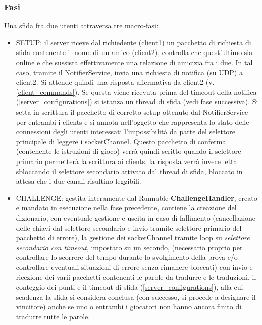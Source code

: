 \documentclass{article}
\begin{document}
    \subsubsection{Fasi}\label{server_challenge_phases} Una sfida fra due utenti attraversa tre macro-fasi:
    \begin{itemize}
        \item SETUP: il server riceve dal richiedente (client1) un pacchetto di richiesta di sfida contenente il nome di un amico (client2), controlla che quest'ultimo sia online e che sussista effettivamente una relazione di amicizia fra i due. In tal caso, tramite il NotifierService, invia una richiesta di notifica (su UDP) a client2. Si attende quindi una risposta affermativa da client2 (v. \ref{client_commands}). Se questa viene ricevuta prima del timeout della notifica (\ref{server_configurations}) si istanza un thread di sfida (vedi fase successiva). Si setta in scrittura il pacchetto di corretto setup ottenuto dal NotifierService per entrambi i clients e si annota nell'oggetto che rappresenta lo stato delle connessioni degli utenti interessati l'impossibilità da parte del selettore principale di leggere i socketChannel. Questo pacchetto di conferma (contenente le istruzioni di gioco) verrà quindi scritto quando il selettore primario permetterà la scrittura ai clients, la risposta verrà invece letta sbloccando il selettore secondario attivato dal thread di sfida, bloccato in attesa che i due canali risultino leggibili.
        \item CHALLENGE: gestita interamente dal Runnable \textbf{ChallengeHandler}, creato e mandato in esecuzione nella fase precedente, contiene la creazione del dizionario, con eventuale gestione e uscita in caso di fallimento (cancellazione delle chiavi dal selettore secondario e invio tramite selettore primario del pacchetto di errore), la gestione dei socketChannel tramite loop su \textit{selettore secondario con timeout}, impostato su un secondo, (necessario proprio per controllare lo scorrere del tempo durante lo svolgimento della prova e/o controllare eventuali situazioni di errore senza rimanere bloccati) con invio e ricezione dei varii pacchetti contenenti le parole da tradurre e le traduzioni,
        il conteggio dei punti e il timeout di sfida (\ref{server_configurations}), alla cui scadenza la sfida si considera conclusa (con successo, si procede a designare il vincitore) anche se uno o entrambi i giocatori non hanno ancora finito di tradurre tutte le parole.

\end{itemize}
\end{document}
